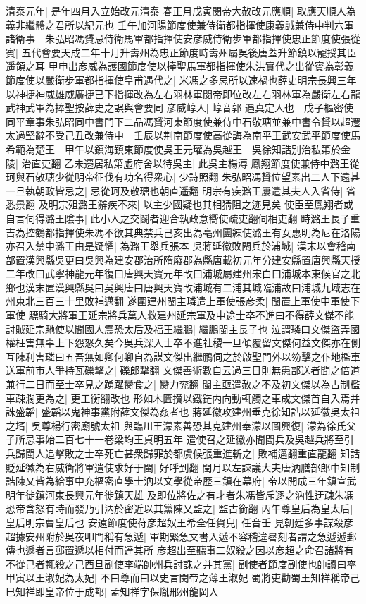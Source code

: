 清泰元年|{
	是年四月入立始改元清泰}
春正月戊寅閔帝大赦改元應順|{
	取應天順人為義非繼體之君所以紀元也}
壬午加河陽節度使兼侍衛都指揮使康義誠兼侍中判六軍諸衛事　朱弘昭馮贇忌侍衛馬軍都指揮使安彦威侍衛步軍都指揮使忠正節度使張從賓|{
	五代會要天成二年十月升壽州為忠正節度時壽州屬吳後唐蓋升節鎮以寵授其臣遥領之耳}
甲申出彦威為護國節度使以捧聖馬軍都指揮使朱洪實代之出從賓為彰義節度使以嚴衛步軍都指揮使皇甫遇代之|{
	米馮之多忌所以速禍也薛史明宗長興三年以神捷神威雄威廣捷已下指揮改為左右羽林軍閔帝即位改左右羽林軍為嚴衛左右龍武神武軍為捧聖按薛史之誤與會要同}
彦威崞人|{
	崞音郭}
遇真定人也　戊子樞密使同平章事朱弘昭同中書門下二品馮贇河東節度使兼侍中石敬瑭並兼中書令贇以超遷太過堅辭不受己丑改兼侍中　壬辰以荆南節度使高從誨為南平王武安武平節度使馬希範為楚王　甲午以鎮海鎮東節度使吳王元瓘為吳越王　吳徐知誥别治私第於金陵|{
	治直吏翻}
乙未遷居私第虛府舍以待吳主|{
	此吳主楊溥}
鳳翔節度使兼侍中潞王從珂與石敬瑭少從明帝征伐有功名得衆心|{
	少詩照翻}
朱弘昭馮贇位望素出二人下遠甚一旦執朝政皆忌之|{
	忌從珂及敬瑭也朝直遥翻}
明宗有疾潞王屢遣其夫人入省侍|{
	省悉景翻}
及明宗殂潞王辭疾不來|{
	以主少國疑也其相猜阻之迹見矣}
使臣至鳳翔者或自言伺得潞王隂事|{
	此小人之交鬬者迎合執政意嚮使疏吏翻伺相吏翻}
時潞王長子重吉為控鶴都指揮使朱馮不欲其典禁兵己亥出為亳州團練使潞王有女惠明為尼在洛陽亦召入禁中潞王由是疑懼|{
	為潞王舉兵張本}
吳蔣延徽敗閩兵於浦城|{
	漢末以會稽南部置漢興縣吳更曰吳興為建安郡治所隋廢郡為縣唐載初元年分建安縣置唐興縣天授二年改曰武寧神龍元年復曰唐興天寶元年改曰浦城屬建州宋白曰浦城本東候官之北鄉也漢末置漢興縣吳曰吳興唐曰唐興天寶改浦城有二浦其城臨浦故曰浦城九域志在州東北三百三十里敗補邁翻}
遂圍建州閩主璘遣上軍使張彦柔|{
	閩置上軍使中軍使下軍使}
驃騎大將軍王延宗將兵萬人救建州延宗軍及中途士卒不進曰不得薛文傑不能討賊延宗馳使以聞國人震恐太后及福王繼鵬|{
	繼鵬閩主長子也}
泣謂璘曰文傑盜弄國權枉害無辜上下怨怒久矣今吳兵深入士卒不進社稷一旦傾覆留文傑何益文傑亦在側互陳利害璘曰五吾無如卿何卿自為謀文傑出繼鵬伺之於啟聖門外以笏擊之仆地檻車送軍前市人爭持瓦礫擊之|{
	礫郎撃翻}
文傑善術數自云過三日則無患部送者聞之倍道兼行二日而至士卒見之踴躍臠食之|{
	臠力兖翻}
閩主亟遣赦之不及初文傑以為古制檻車疎濶更為之|{
	更工衡翻改也}
形如木匱攅以鐵鋩内向動輒觸之車成文傑首自入焉并誅盛韜|{
	盛韜以鬼神事黨附薛文傑為姦者也}
蔣延徽攻建州垂克徐知誥以延徽吳太祖之壻|{
	吳尊楊行密廟號太祖}
與臨川王濛素善恐其克建州奉濛以圖興復|{
	濛為徐氏父子所忌事始二百七十一卷梁均王貞明五年}
遣使召之延徽亦聞閩兵及吳越兵將至引兵歸閩人追擊敗之士卒死亡甚衆歸罪於都虞候張重進斬之|{
	敗補邁翻重直龍翻}
知誥貶延徽為右威衛將軍遣使求好于閩|{
	好呼到翻}
閏月以左諫議大夫唐汭膳部郎中知制誥陳乂皆為給事中充樞密直學士汭以文學從帝歷三鎮在幕府|{
	帝以開成三年鎮宣武明年徙鎮河東長興元年徙鎮天雄}
及即位將佐之有才者朱馮皆斥逐之汭性迂疎朱馮恐帝含怒有時而發乃引汭於密近以其黨陳乂監之|{
	監古銜翻}
丙午尊皇后為皇太后|{
	皇后明宗曹皇后也}
安遠節度使苻彦超奴王希全任賀兒|{
	任音壬}
見朝廷多事謀殺彦超據安州附於吳夜叩門稱有急遞|{
	軍期緊急文書入遞不容稽違晷刻者謂之急遞遞郵傳也遞者言郵置遞以相付而達其所}
彦超出至聽事二奴殺之因以彦超之命召諸將有不從己者輒殺之己酉旦副使李端帥州兵討誅之并其黨|{
	副使者節度副使也帥讀曰率}
甲寅以王淑妃為太妃|{
	不曰尊而曰以史言閔帝之薄王淑妃}
蜀將吏勸蜀王知祥稱帝己巳知祥即皇帝位于成都|{
	孟知祥字保胤邢州龍岡人}


